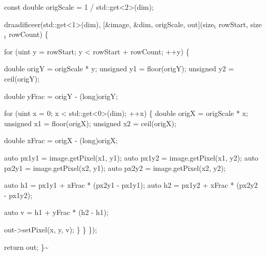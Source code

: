 \documentclass[a4paper]{article}
\begin{document}
const double origScale = 1 / std::get<2>(dim);

draadificeer(std::get<1>(dim), [\&image, \&dim, origScale, out](size\(_{\text{t}}\) rowStart, size\(_{\text{t}}\) rowCount) \{

for (uint y = rowStart; y < rowStart + rowCount; ++y) \{

double origY = origScale * y;
unsigned y1  = floor(origY);
unsigned y2  =  ceil(origY);

double yFrac = origY - (long)origY;

for (uint x = 0; x < std::get<0>(dim); ++x) \{
    double origX = origScale * x;
    unsigned x1  = floor(origX);
    unsigned x2  =  ceil(origX);

double xFrac = origX - (long)origX;

auto px1y1 = image.getPixel(x1, y1);
auto px1y2 = image.getPixel(x1, y2);
auto px2y1 = image.getPixel(x2, y1);
auto px2y2 = image.getPixel(x2, y2);

auto h1 = px1y1 + xFrac * (px2y1 - px1y1);
auto h2 = px1y2 + xFrac * (px2y2 - px1y2);

auto v = h1 + yFrac * (h2 - h1);

            out->setPixel(x, y, v);
        \}
    \}
\});

    return out;
\}\textasciitilde{}
\end{document}
